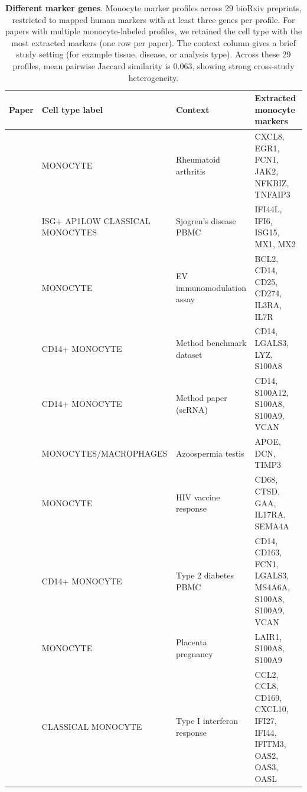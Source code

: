 \documentclass[10pt,twocolumn]{article}
\theoremstyle{plain}
\theoremstyle{definition}
\theoremstyle{remark}
\begin{document}
\begin{table}[ht!]
  \centering
  \caption{\textbf{Different marker genes}. Monocyte marker profiles across 29 bioRxiv preprints, restricted to mapped human markers with at least three genes per profile. For papers with multiple monocyte-labeled profiles, we retained the cell type with the most extracted markers (one row per paper). The context column gives a brief study setting (for example tissue, disease, or analysis type). Across these 29 profiles, mean pairwise Jaccard similarity is 0.063, showing strong cross-study heterogeneity.}
  \label{tab:monocyte_papers}%
  \footnotesize
  \setlength{\tabcolsep}{3pt}
  \begin{tabular}{@{}l p{3.6cm} p{2.7cm} p{7.1cm}@{}}
  \toprule
  Paper & Cell type label & Context & Extracted monocyte markers \\
  \midrule
  \citep{Preglej2025} & MONOCYTE & Rheumatoid arthritis & CXCL8, EGR1, FCN1, JAK2, NFKBIZ, TNFAIP3  \\ [4pt]
  \citep{Urbanski2025biorxiv640483} & ISG+ AP1LOW CLASSICAL MONOCYTES & Sjogren's disease PBMC & IFI44L, IFI6, ISG15, MX1, MX2  \\ [4pt]
  \citep{Bachurski2025} & MONOCYTE & EV immunomodulation assay & BCL2, CD14, CD25, CD274, IL3RA, IL7R  \\ [4pt]
  \citep{Imoto2025} & CD14+ MONOCYTE & Method benchmark dataset & CD14, LGALS3, LYZ, S100A8  \\ [4pt]
  \citep{Wang2020celda} & CD14+ MONOCYTE & Method paper (scRNA) & CD14, S100A12, S100A8, S100A9, VCAN  \\ [4pt]
  \citep{Wu2022biorxiv520033} & MONOCYTES/\allowbreak MACROPHAGES & Azoospermia testis & APOE, DCN, TIMP3  \\ [4pt]
  \citep{Shangguan2021} & MONOCYTE & HIV vaccine response & CD68, CTSD, GAA, IL17RA, SEMA4A  \\ [4pt]
  \citep{Zhao2024} & CD14+ MONOCYTE & Type 2 diabetes PBMC & CD14, CD163, FCN1, LGALS3, MS4A6A, S100A8, S100A9, VCAN  \\ [4pt]
  \citep{Obolenska2025} & MONOCYTE & Placenta pregnancy & LAIR1, S100A8, S100A9  \\ [4pt]
  \citep{Rigby2023} & CLASSICAL MONOCYTE & Type I interferon response & CCL2, CCL8, CD169, CXCL10, IFI27, IFI44, IFITM3, OAS2, OAS3, OASL  \\ [4pt]

\end{tabular}
\end{table}
\end{document}
